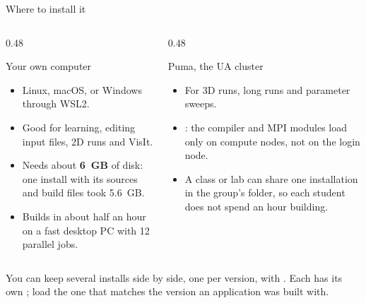 \documentclass[aspectratio=169,11pt]{beamer}
\begin{document}
\begin{frame}{Where to install it}
\begin{columns}[T,onlytextwidth]
\begin{column}{0.48\textwidth}
\begin{block}{Your own computer}
\begin{itemize}\small
  \item Linux, macOS, or Windows through WSL2.
  \item Good for learning, editing input files, 2D runs and VisIt.
  \item Needs about \textbf{6~GB} of disk: one install with its sources and build files took 5.6~GB.
  \item Builds in about half an hour on a fast desktop PC with 12 parallel jobs.
\end{itemize}
\end{block}
\end{column}
\begin{column}{0.48\textwidth}
\begin{block}{Puma, the UA cluster}
\begin{itemize}\small
  \item For 3D runs, long runs and parameter sweeps.
  \item {}: the compiler and MPI modules load only on compute nodes, not on the login node.
  \item A class or lab can share one installation in the group's folder, so each student does not spend an hour building.
\end{itemize}
\end{block}
\end{column}
\end{columns}
\vspace{4mm}
\begin{punchbox}
\small You can keep several installs side by side, one per version, with . Each has its own ; load the one that matches the version an application was built with.
\end{punchbox}
\end{frame}
\end{document}
